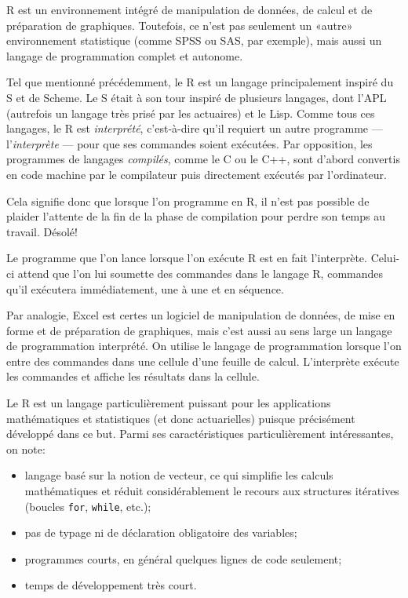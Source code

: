 \documentclass[11pt,article,french]{memoir}
\begin{document}
R est un environnement intégré de manipulation de données, de calcul
et de préparation de graphiques. Toutefois, ce n'est pas seulement un
«autre» environnement statistique (comme SPSS ou SAS, par exemple),
mais aussi un langage de programmation complet et autonome.

Tel que mentionné précédemment, le R est un langage principalement
inspiré du S et de Scheme. Le S était à son tour inspiré de plusieurs
langages, dont l'APL (autrefois un langage très prisé par les
actuaires) et le Lisp. Comme tous ces langages, le R est
\emph{interprété}, c'est-à-dire qu'il requiert un autre programme ---
l'\emph{interprète} --- pour que ses commandes soient exécutées. Par
opposition, les programmes de langages \emph{compilés}, comme le C ou
le C++, sont d'abord convertis en code machine par le compilateur puis
directement exécutés par l'ordinateur.

Cela signifie donc que lorsque l'on programme en R, il n'est pas
possible de plaider l'attente de la fin de la phase de compilation
pour perdre son temps au travail. Désolé!

Le programme que l'on lance lorsque l'on exécute R est en fait
l'interprète. Celui-ci attend que l'on lui soumette des commandes dans
le langage R, commandes qu'il exécutera immédiatement, une à une et
en séquence.

Par analogie, Excel est certes un logiciel de manipulation de données,
de mise en forme et de préparation de graphiques, mais c'est aussi au
sens large un langage de programmation interprété. On utilise le
langage de programmation lorsque l'on entre des commandes dans une
cellule d'une feuille de calcul. L'interprète exécute les commandes et
affiche les résultats dans la cellule.

Le R est un langage particulièrement puissant pour les applications
mathématiques et statistiques (et donc actuarielles) puisque
précisément développé dans ce but. Parmi ses caractéristiques
particulièrement intéressantes, on note:
\begin{itemize}
\item langage basé sur la notion de vecteur, ce qui simplifie les
  calculs mathématiques et réduit considérablement le recours aux
  structures itératives (boucles \texttt{for}, \texttt{while}, etc.);
\item pas de typage ni de déclaration obligatoire des variables;
\item programmes courts, en général quelques lignes de code seulement;
\item temps de développement très court.
\end{itemize}
\end{document}
